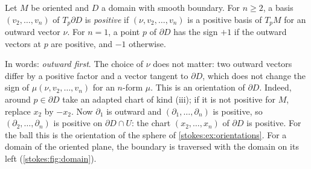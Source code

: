 \begin{notechapter}
\begin{definition}\label{stokes:def:bdry-orientation}
Let $M$ be oriented and $D$ a domain with smooth boundary. For
$n\geq2$, a basis $(v_2,\dots,v_n)$ of $T_p\partial D$ is
\emph{positive} if $(\nu, v_2,\dots,v_n)$ is a positive basis of $T_pM$
for an outward vector $\nu$. For $n = 1$, a point $p$ of $\partial D$
has the sign $+1$ if the outward vectors at $p$ are positive, and $-1$
otherwise.
\end{definition}

In words: \emph{outward first}. The choice of $\nu$ does not matter:
two outward vectors differ by a positive factor and a vector tangent to
$\partial D$, which does not change the sign of
$\mu(\nu, v_2,\dots,v_n)$ for an $n$-form $\mu$. This is an orientation
of $\partial D$. Indeed, around $p\in\partial D$ take an adapted chart
of kind (iii); if it is not positive for $M$, replace $x_2$ by $-x_2$.
Now $\partial_1$ is outward and $(\partial_1,\dots,\partial_n)$ is
positive, so $(\partial_2,\dots,\partial_n)$ is positive on
$\partial D\cap U$: the chart $(x_2,\dots,x_n)$ of $\partial D$ is
positive. For the ball this is the orientation of the sphere of
\cref{stokes:ex:orientations}. For a domain of the oriented plane, the
boundary is traversed with the domain on its left
(\cref{stokes:fig:domain}).


\end{notechapter}
